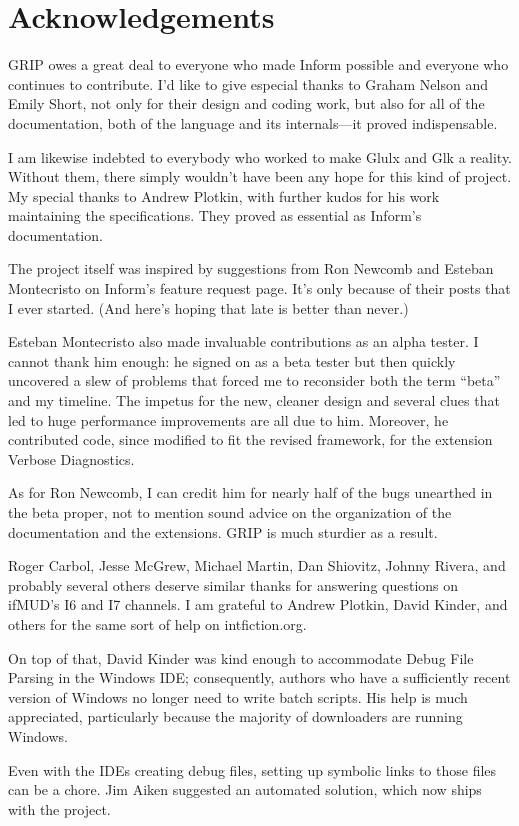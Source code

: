 \documentclass{book}
\newcommand{\lastpagebreak}{\vfill\pagebreak}
\newcommand{\frontchapter}[1]{\chapter{#1}\fancyhead[LO,RE]{\slshape\MakeUppercase{#1}}}
\begin{document}
\lastpagebreak

\frontchapter{Acknowledgements}

GRIP owes a great deal to everyone who made Inform possible and everyone who
continues to contribute.  I'd like to give especial thanks to Graham Nelson and
Emily Short, not only for their design and coding work, but also for all of the
documentation, both of the language and its internals---it proved indispensable.

I am likewise indebted to everybody who worked to make Glulx and Glk a reality.
Without them, there simply wouldn't have been any hope for this kind of project.
My special thanks to Andrew Plotkin, with further kudos for his work maintaining
the specifications.  They proved as essential as Inform's documentation.

The project itself was inspired by suggestions from Ron Newcomb and Esteban
Montecristo on Inform's feature request page.  It's only because of their posts
that I ever started.  (And here's hoping that late is better than never.)

Esteban Montecristo also made invaluable contributions as an alpha tester.  I
cannot thank him enough: he signed on as a beta tester but then quickly
uncovered a slew of problems that forced me to reconsider both the term ``beta''
and my timeline.  The impetus for the new, cleaner design and several clues that
led to huge performance improvements are all due to him.  Moreover, he
contributed code, since modified to fit the revised framework, for the extension
Verbose Diagnostics.

As for Ron Newcomb, I can credit him for nearly half of the bugs unearthed in
the beta proper, not to mention sound advice on the organization of the
documentation and the extensions.  GRIP is much sturdier as a result.

Roger Carbol, Jesse McGrew, Michael Martin, Dan Shiovitz, Johnny Rivera, and
probably several others deserve similar thanks for answering questions on
ifMUD's I6 and I7 channels.  I am grateful to Andrew Plotkin, David Kinder, and
others for the same sort of help on intfiction.org.

On top of that, David Kinder was kind enough to accommodate Debug File Parsing
in the Windows IDE; consequently, authors who have a sufficiently recent version
of Windows no longer need to write batch scripts.  His help is much appreciated,
particularly because the majority of downloaders are running Windows.

Even with the IDEs creating debug files, setting up symbolic links to those
files can be a chore.  Jim Aiken suggested an automated solution, which now
ships with the project.
\end{document}
